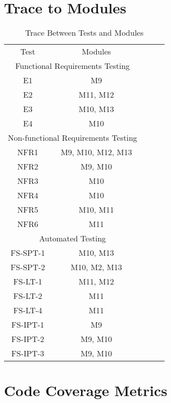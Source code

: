 \documentclass[12pt, titlepage]{article}
\begin{document}
	
	
	\section{Trace to Modules}		
	
	\begin{table}[h!]
		\centering
		\begin{tabular}{|cc|lll}
			\cline{1-2}
			\multicolumn{1}{|c|}{Test} & Modules & \multicolumn{1}{c}{} & \multicolumn{1}{c}{} &  \\ \cline{1-2}
			\multicolumn{2}{|c|}{Functional Requirements Testing} &  &  &  \\ \cline{1-2}
			\multicolumn{1}{|c|}{E1} & M9 &  &  &  \\ \cline{1-2}
			\multicolumn{1}{|c|}{E2} & M11, M12 &  &  &  \\ \cline{1-2}
			\multicolumn{1}{|c|}{E3} & M10, M13 &  &  &  \\ \cline{1-2}
			\multicolumn{1}{|c|}{E4} & M10 &  &  &  \\ \cline{1-2}
			
			\multicolumn{2}{|c|}{Non-functional Requirements Testing} &  &  &  \\ \cline{1-2}
			\multicolumn{1}{|c|}{NFR1} & M9, M10, M12, M13 &  &  &  \\ \cline{1-2}
			\multicolumn{1}{|c|}{NFR2} & M9, M10 &  &  &  \\ \cline{1-2}
			\multicolumn{1}{|c|}{NFR3} & M10 &  &  &  \\ \cline{1-2}
			\multicolumn{1}{|c|}{NFR4} & M10 &  &  &  \\ \cline{1-2}
			\multicolumn{1}{|c|}{NFR5} & M10, M11 &  &  &  \\ \cline{1-2}
			\multicolumn{1}{|c|}{NFR6} & M11 &  &  &  \\ \cline{1-2}
			
			\multicolumn{2}{|c|}{Automated Testing} &  &  &  \\ \cline{1-2}
			\multicolumn{1}{|c|}{FS-SPT-1} & M10, M13 &  &  &  \\ \cline{1-2}
			\multicolumn{1}{|c|}{FS-SPT-2} & M10, M2, M13&  &  &  \\ \cline{1-2}
			\multicolumn{1}{|c|}{FS-LT-1} & M11, M12 &  &  &  \\ \cline{1-2}
			\multicolumn{1}{|c|}{FS-LT-2} & M11 &  &  &  \\ \cline{1-2}
			\multicolumn{1}{|c|}{FS-LT-4} & M11 &  &  &  \\ \cline{1-2}
			\multicolumn{1}{|c|}{FS-IPT-1} & M9 &  &  &  \\ \cline{1-2}
			\multicolumn{1}{|c|}{FS-IPT-2} & M9, M10 &  &  &  \\ \cline{1-2}
			\multicolumn{1}{|c|}{FS-IPT-3} & M9, M10 &  &  &  \\ \cline{1-2}
			
		\end{tabular}
		\caption{Trace Between Tests and Modules}
		\label{tab:my-table}
	\end{table}	
	
	
	
	\section{Code Coverage Metrics}
	
	
	
	
	
\end{document}
